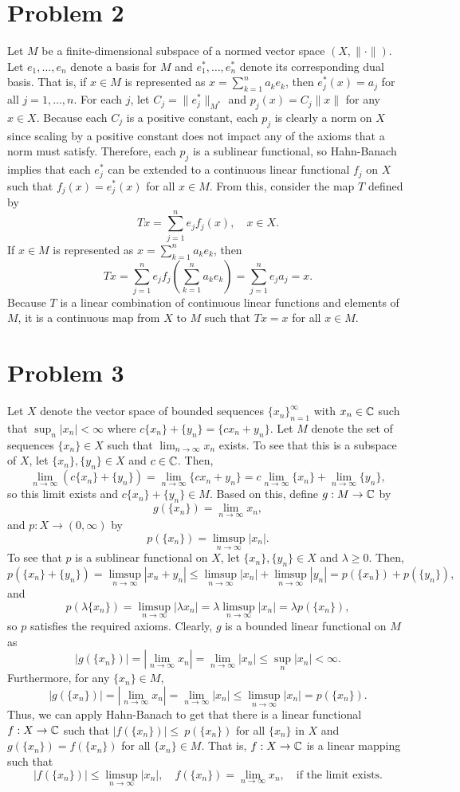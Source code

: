 \documentclass{article}
\begin{document}
\section{Problem 2}
Let $M$ be a finite-dimensional subspace of a normed vector space $(X,\|\cdot\|)$. Let $e_1,\ldots,e_n$ denote a basis for $M$ and  $e_1^*,\ldots,e_n^*$ denote its corresponding dual basis. That is, if $x\in M$ is represented as $x=\sum_{k=1}^na_ke_k$, then $e_j^*(x)=a_j$ for all $j=1,\ldots,n$. For each $j$, let $C_j=\|e^*_j\|_{M^*}$ and $p_j(x)=C_j\|x\|$ for any $x\in X$. Because each $C_j$ is a positive constant, each $p_j$ is clearly a norm on $X$ since scaling by a positive constant does not impact any of the axioms that a norm must satisfy. Therefore, each $p_j$ is a sublinear functional, so Hahn-Banach implies that each $e^*_j$ can be extended to a continuous linear functional $f_j$ on $X$ such that $f_j(x)=e^*_j(x)$ for all $x\in M$. From this, consider the map $T$ defined by 
\[
Tx=\sum_{j=1}^{n}e_jf_j(x), \quad x\in X.
\]
If $x\in M$ is represented as $x=\sum_{k=1}^na_ke_k$, then
\[
Tx=\sum_{j=1}^{n}e_jf_j\left(\sum_{k=1}^na_ke_k\right)=\sum_{j=1}^{n}e_ja_j=x.
\]
Because $T$ is a linear combination of continuous linear functions and elements of $M$, it is a continuous map from $X$ to $M$ such that $Tx=x$ for all $x\in M$.

\section{Problem 3}
Let $X$ denote the vector space of bounded sequences $\{x_n\}_{n=1}^\infty$ with $x_n\in\mathbb{C}$ such that $\sup_n|x_n|<\infty$ where $c\{x_n\}+\{y_n\}=\{cx_n+y_n\}$. Let $M$ denote the set of sequences $\{x_n\}\in X$ such that $\lim_{n\to\infty}x_n$ exists. To see that this is a subspace of $X$, let $\{x_n\},\{y_n\}\in X$ and $c\in\mathbb{C}$. Then, 
\[
\lim_{n\to\infty}(c\{x_n\}+\{y_n\})=\lim_{n\to\infty}\{cx_n+y_n\}=c\lim_{n\to\infty}\{x_n\}+\lim_{n\to\infty}\{y_n\},
\]
so this limit exists and $c\{x_n\}+\{y_n\}\in M$. Based on this, define $g:M\to\mathbb{C}$ by 
\[
g(\{x_n\})=\lim_{n\to\infty}x_n,
\]
and $p:X\to(0,\infty)$ by
\[
p(\{x_n\})=\limsup_{n\to\infty}|x_n|.
\]
To see that $p$ is a sublinear functional on $X$, let $\{x_n\},\{y_n\}\in X$ and $\lambda\geq0$. Then,
\[
p(\{x_n\}+\{y_n\})=\limsup_{n\to\infty}|x_n+y_n|\leq\limsup_{n\to\infty}|x_n|+\limsup_{n\to\infty}|y_n|=p(\{x_n\})+p(\{y_n\}),
\]
and
\[
p(\lambda\{x_n\})=\limsup_{n\to\infty}|\lambda x_n|=\lambda\limsup_{n\to\infty}|x_n|=\lambda p(\{x_n\}),
\]
so $p$ satisfies the required axioms. Clearly, $g$ is a bounded linear functional on $M$ as 
\[
|g(\{x_n\})|=\left|\lim_{n\to\infty}x_n\right|=\lim_{n\to\infty}|x_n|\leq\sup_n|x_n|<\infty.
\]
Furthermore, for any $\{x_n\}\in M$, 
\[
|g(\{x_n\})|=\left|\lim_{n\to\infty}x_n\right|=\lim_{n\to\infty}|x_n|\leq\limsup_{n\to\infty}|x_n|=p(\{x_n\}).
\]
Thus, we can apply Hahn-Banach to get that there is a linear functional $f:X\to\mathbb{C}$ such that $|f(\{x_n\})|\leq~ p(\{x_n\})$ for all $\{x_n\}$ in $X$ and $g(\{x_n\})=f(\{x_n\})$ for all $\{x_n\}\in M$. That is, $f:X\to\mathbb{C}$ is a linear mapping such that 
\[
|f(\{x_n\})|\leq\limsup_{n\to\infty}|x_n|,\quad f(\{x_n\})=\lim_{n\to\infty}x_n,\quad \text{if the limit exists}.
\]
\end{document}
